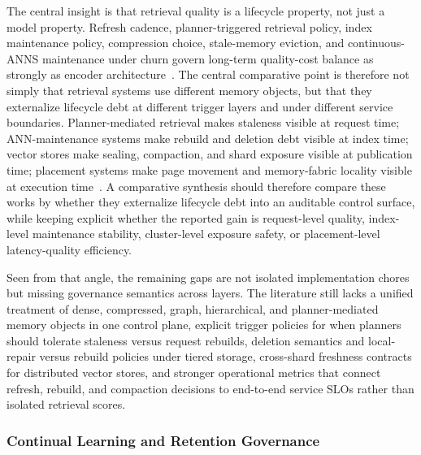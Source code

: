 \documentclass[acmsmall,screen,review]{acmart}
\begin{document}
The central insight is that retrieval quality is a lifecycle property, not just a model property. Refresh cadence, planner-triggered retrieval policy, index maintenance policy, compression choice, stale-memory eviction, and continuous-ANNS maintenance under churn govern long-term quality-cost balance as strongly as encoder architecture~\cite{asai2024selfrag,wang2026candor,zhang2026flowrag}. The central comparative point is therefore not simply that retrieval systems use different memory objects, but that they externalize lifecycle debt at different trigger layers and under different service boundaries. Planner-mediated retrieval makes staleness visible at request time; ANN-maintenance systems make rebuild and deletion debt visible at index time; vector stores make sealing, compaction, and shard exposure visible at publication time; placement systems make page movement and memory-fabric locality visible at execution time~\cite{asai2024selfrag,singh2021freshdiskann,xu2023spfresh,xu2025place,wang2021milvus,guo2022manu,zhang2024rummy,quinn2025accelerating,zhang2026flowrag,wang2026candor}. A comparative synthesis should therefore compare these works by whether they externalize lifecycle debt into an auditable control surface, while keeping explicit whether the reported gain is request-level quality, index-level maintenance stability, cluster-level exposure safety, or placement-level latency-quality efficiency.

Seen from that angle, the remaining gaps are not isolated implementation chores but missing governance semantics across layers. The literature still lacks a unified treatment of dense, compressed, graph, hierarchical, and planner-mediated memory objects in one control plane, explicit trigger policies for when planners should tolerate staleness versus request rebuilds, deletion semantics and local-repair versus rebuild policies under tiered storage, cross-shard freshness contracts for distributed vector stores, and stronger operational metrics that connect refresh, rebuild, and compaction decisions to end-to-end service SLOs rather than isolated retrieval scores.

\subsubsection{Continual Learning and Retention Governance}
\end{document}
